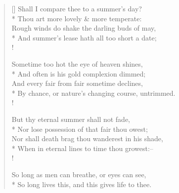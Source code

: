 \documentclass[MAIN]{subfiles}
\begin{document}
\settowidth{\versewidth}{Shall I compare thee to a summer's day?}
\begin{verse}[\versewidth]
Shall I compare thee to a summer's day?\\*
Thou art more lovely \& more temperate:\\
Rough winds do shake the darling buds of may,\\*
And summer's lease hath all too short a date;\\!

Sometime too hot the eye of heaven shines,\\*
And often is his gold complexion dimmed;\\
And every fair from fair sometime declines,\\*
By chance, or nature's changing course, untrimmed.\\!

But thy eternal summer shall not fade,\\*
Nor lose possession of that fair thou owest;\\
Nor shall death brag thou wanderest in his shade,\\*
When in eternal lines to time thou growest:--\\!

So long as men can breathe, or eyes can see,\\*
So long lives this, and this gives life to thee.
\end{verse}
\end{document}
